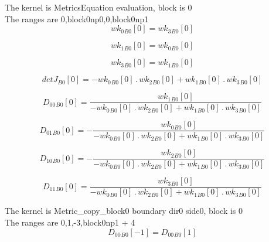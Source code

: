 \documentclass{article}
\begin{document}
\noindent The kernel is MetricsEquation evaluation, block is 0\\\noindent The ranges are 0,block0np0,0,block0np1\\\begin{dmath}{wk_{0}{_{B0}}}[{0}] = {wk_{3}{_{B0}}}[{0}]\end{dmath}

\begin{dmath}{wk_{1}{_{B0}}}[{0}] = {wk_{0}{_{B0}}}[{0}]\end{dmath}

\begin{dmath}{wk_{3}{_{B0}}}[{0}] = {wk_{1}{_{B0}}}[{0}]\end{dmath}

\begin{dmath}{detJ{_{B0}}}[{0}] = - {wk_{0}{_{B0}}}[{0}] \,.\, {wk_{2}{_{B0}}}[{0}] + {wk_{1}{_{B0}}}[{0}] \,.\, {wk_{3}{_{B0}}}[{0}]\end{dmath}

\begin{dmath}{D_{00}{_{B0}}}[{0}] = \frac{{wk_{1}{_{B0}}}[{0}]}{- {wk_{0}{_{B0}}}[{0}] \,.\, {wk_{2}{_{B0}}}[{0}] + {wk_{1}{_{B0}}}[{0}] \,.\, {wk_{3}{_{B0}}}[{0}]}\end{dmath}

\begin{dmath}{D_{01}{_{B0}}}[{0}] = - \frac{{wk_{0}{_{B0}}}[{0}]}{- {wk_{0}{_{B0}}}[{0}] \,.\, {wk_{2}{_{B0}}}[{0}] + {wk_{1}{_{B0}}}[{0}] \,.\, {wk_{3}{_{B0}}}[{0}]}\end{dmath}

\begin{dmath}{D_{10}{_{B0}}}[{0}] = - \frac{{wk_{2}{_{B0}}}[{0}]}{- {wk_{0}{_{B0}}}[{0}] \,.\, {wk_{2}{_{B0}}}[{0}] + {wk_{1}{_{B0}}}[{0}] \,.\, {wk_{3}{_{B0}}}[{0}]}\end{dmath}

\begin{dmath}{D_{11}{_{B0}}}[{0}] = \frac{{wk_{3}{_{B0}}}[{0}]}{- {wk_{0}{_{B0}}}[{0}] \,.\, {wk_{2}{_{B0}}}[{0}] + {wk_{1}{_{B0}}}[{0}] \,.\, {wk_{3}{_{B0}}}[{0}]}\end{dmath}

\noindent The kernel is Metric_copy_block0 boundary dir0 side0, block is 0\\\noindent The ranges are 0,1,-3,block0np1 + 4\\\begin{dmath}{D_{00}{_{B0}}}[{-1}] = {D_{00}{_{B0}}}[{1}]\end{dmath}
\end{document}
